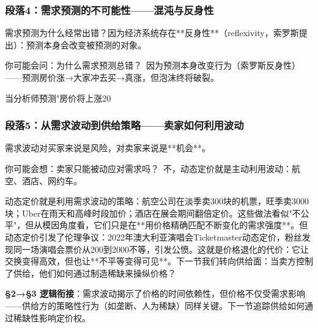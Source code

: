 \documentclass[openany, a4paper, 12pt]{book}
\begin{document}
	\subsubsection*{段落4：需求预测的不可能性——混沌与反身性}
	需求预测为什么经常出错？因为经济系统存在**反身性**（reflexivity，索罗斯提出）：预测本身会改变被预测的对象。
	\begin{tcolorbox}[colback=yellow!5, title=\textit{读者行为预测}]
		你可能会问：为什么需求预测总错？\ 因为预测本身改变行为（索罗斯反身性）——预测房价涨→大家冲去买→真涨，但泡沫终将破裂。
	\end{tcolorbox}

当分析师预测"房价将上涨20%

	\subsubsection*{段落5：从需求波动到供给策略——卖家如何利用波动}
	需求波动对买家来说是风险，对卖家来说是**机会**。
	\begin{tcolorbox}[colback=yellow!5, title=\textit{读者行为预测}]
		你可能会想：卖家只能被动应对需求吗？\ 不，动态定价就是主动利用波动：航空、酒店、网约车。
	\end{tcolorbox}

动态定价就是利用需求波动的策略：航空公司在淡季卖300块的机票，旺季卖3000块；Uber在雨天和高峰时段加价；酒店在展会期间翻倍定价。这些做法看似"不公平"，但从模因角度看，它们只是在**用价格精确匹配不断变化的需求强度**。但动态定价引发了伦理争议：2022年澳大利亚演唱会Ticketmaster动态定价，粉丝发现同一场演唱会票价从200到2000不等，引发公愤。这就是价格退化的代价：它让交换变得高效，但也让**不平等变得可见**。下一节我们转向供给面：当卖方控制了供给，他们如何通过制造稀缺来操纵价格？

	\textbf{§2→§3 逻辑衔接}：需求波动揭示了价格的时间依赖性，但价格不仅受需求影响——供给方的策略性行为（如垄断、人为稀缺）同样关键。下一节追踪供给如何通过稀缺性影响定价权。

	
\end{document}

